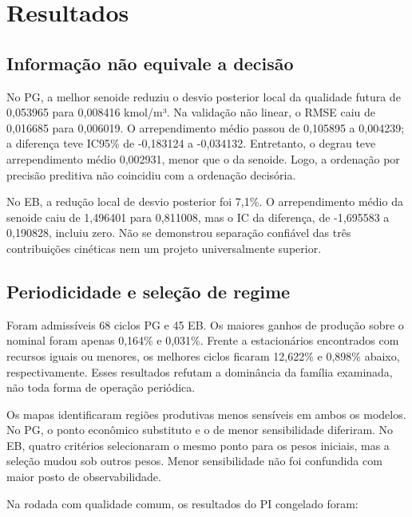 \documentclass[
  11pt,
  letterpaper,
]{article}
\begin{document}
\hypertarget{resultados}{%
\section{Resultados}\label{resultados}}

\hypertarget{informauxe7uxe3o-nuxe3o-equivale-a-decisuxe3o}{%
\subsection{Informação não equivale a
decisão}\label{informauxe7uxe3o-nuxe3o-equivale-a-decisuxe3o}}

No PG, a melhor senoide reduziu o desvio posterior local da qualidade
futura de 0,053965 para 0,008416 kmol/m³. Na validação não linear, o
RMSE caiu de 0,016685 para 0,006019. O arrependimento médio passou de
0,105895 a 0,004239; a diferença teve IC95\% de -0,183124 a -0,034132.
Entretanto, o degrau teve arrependimento médio 0,002931, menor que o da
senoide. Logo, a ordenação por precisão preditiva não coincidiu com a
ordenação decisória.

No EB, a redução local de desvio posterior foi 7,1\%. O arrependimento
médio da senoide caiu de 1,496401 para 0,811008, mas o IC da diferença,
de -1,695583 a 0,190828, incluiu zero. Não se demonstrou separação
confiável das três contribuições cinéticas nem um projeto universalmente
superior.

\hypertarget{periodicidade-e-seleuxe7uxe3o-de-regime}{%
\subsection{Periodicidade e seleção de
regime}\label{periodicidade-e-seleuxe7uxe3o-de-regime}}

Foram admissíveis 68 ciclos PG e 45 EB. Os maiores ganhos de produção
sobre o nominal foram apenas 0,164\% e 0,031\%. Frente a estacionários
encontrados com recursos iguais ou menores, os melhores ciclos ficaram
12,622\% e 0,898\% abaixo, respectivamente. Esses resultados refutam a
dominância da família examinada, não toda forma de operação periódica.

Os mapas identificaram regiões produtivas menos sensíveis em ambos os
modelos. No PG, o ponto econômico substituto e o de menor sensibilidade
diferiram. No EB, quatro critérios selecionaram o mesmo ponto para os
pesos iniciais, mas a seleção mudou sob outros pesos. Menor
sensibilidade não foi confundida com maior posto de observabilidade.

Na rodada com qualidade comum, os resultados do PI congelado foram:
\end{document}
